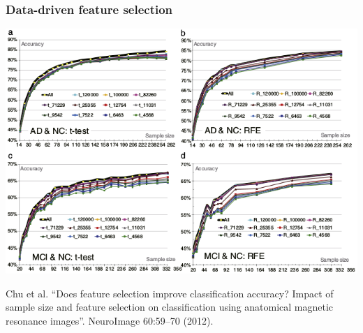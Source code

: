 \begin{frame}
\frametitle{Data-driven feature selection}
\begin{center}
\includegraphics[height=0.55\textwidth]{data_driven_feature_selection.png}\par
\begin{tiny}
Chu et al. ``Does feature selection improve classification accuracy? Impact of sample size and feature selection on classification using anatomical magnetic resonance images''.  NeuroImage 60:59--70 (2012).\par
\end{tiny}
\end{center}
\end{frame}

